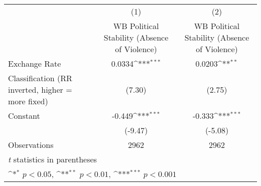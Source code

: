 {
\def\sym#1{\ifmmode^{#1}\else\(^{#1}\)\fi}
\begin{tabular}{l*{2}{c}}
\hline\hline
                    &\multicolumn{1}{c}{(1)}&\multicolumn{1}{c}{(2)}\\
                    &\multicolumn{1}{c}{WB Political Stability (Absence of Violence)}&\multicolumn{1}{c}{WB Political Stability (Absence of Violence)}\\
\hline
Exchange Rate       &      0.0334\sym{***}&      0.0203\sym{**} \\
Classification (RR inverted, higher = more fixed)&      (7.30)         &      (2.75)         \\
[1em]
Constant            &      -0.449\sym{***}&      -0.333\sym{***}\\
                    &     (-9.47)         &     (-5.08)         \\
\hline
Observations        &        2962         &        2962         \\
\hline\hline
\multicolumn{3}{l}{\footnotesize \textit{t} statistics in parentheses}\\
\multicolumn{3}{l}{\footnotesize \sym{*} \(p<0.05\), \sym{**} \(p<0.01\), \sym{***} \(p<0.001\)}\\
\end{tabular}
}
